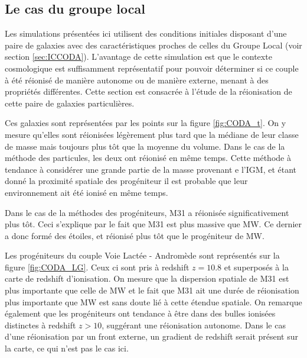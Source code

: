 \subsection{Le cas du groupe local}

Les simulations présentées ici utilisent des conditions initiales disposant d'une paire de galaxies avec des caractéristiques proches de celles du Groupe Local (voir section \ref{sec:ICCODA}).
L'avantage de cette simulation est que le contexte cosmologique est suffisamment représentatif pour pouvoir déterminer si ce couple à été réionisé de manière autonome ou de manière externe, menant à des propriétés différentes.
Cette section est consacrée à l'étude de la réionisation de cette paire de galaxies particulières.

Ces galaxies sont représentées par les points sur la figure \ref{fig:CODA_t}. 
On y mesure qu'elles sont réionisées légèrement plus tard que la médiane de leur classe de masse mais toujours plus tôt que la moyenne du volume.
Dans le cas de la méthode des particules, les deux ont réionisé en même temps.
Cette méthode à tendance à considérer une grande partie de la masse provenant e l'\ac{IGM}, et étant donné la proximité spatiale des progéniteur il est probable que leur environnement ait été ionisé en même temps.

Dans le cas de la méthodes des progéniteurs, M31 a réionisée significativement plus tôt.
Ceci s'explique par le fait que M31 est plus massive que MW. %
Ce dernier a donc formé des étoiles, et réionisé plus tôt que le progéniteur de MW.



Les progéniteurs du couple Voie Lactée - Andromède sont représentés sur la figure \ref{fig:CODA_LG}.
Ceux ci sont pris à redshift $z=10.8$ et superposés à la carte de redshift d'ionisation.
On mesure que la dispersion spatiale de M31 est plus importante que celle de MW et le fait que M31 ait une durée de réionisation plus importante que MW est sans doute lié à cette étendue spatiale.
On remarque également que les progéniteurs ont tendance à être dans des bulles ionisées distinctes à redshift $z>10$, suggérant une réionisation autonome.
Dans le cas d'une réionisation par un front externe, un gradient de redshift serait présent sur la carte, ce qui n'est pas le cas ici.

